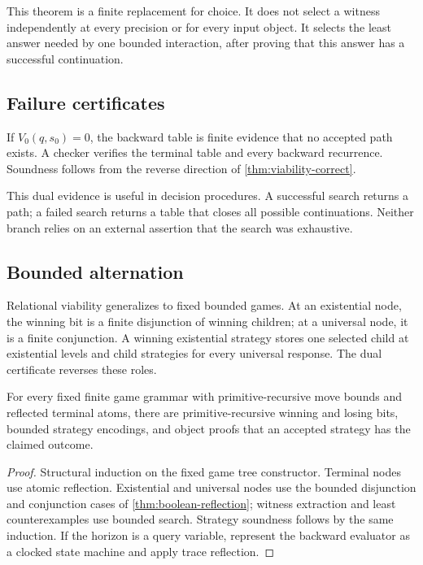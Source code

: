 This theorem is a finite replacement for choice.  It does not select a witness independently at every precision or for every input object.  It selects the least answer needed by one bounded interaction, after proving that this answer has a successful continuation.

\subsection{Failure certificates}

If \(V_0(q,s_0)=0\), the backward table is finite evidence that no accepted path exists.  A checker verifies the terminal table and every backward recurrence.  Soundness follows from the reverse direction of \cref{thm:viability-correct}.

This dual evidence is useful in decision procedures.  A successful search returns a path; a failed search returns a table that closes all possible continuations.  Neither branch relies on an external assertion that the search was exhaustive.

\subsection{Bounded alternation}

Relational viability generalizes to fixed bounded games.  At an existential node, the winning bit is a finite disjunction of winning children; at a universal node, it is a finite conjunction.  A winning existential strategy stores one selected child at existential levels and child strategies for every universal response.  The dual certificate reverses these roles.

\begin{proposition}
For every fixed finite game grammar with primitive-recursive move bounds and reflected terminal atoms, there are primitive-recursive winning and losing bits, bounded strategy encodings, and object proofs that an accepted strategy has the claimed outcome.
\end{proposition}

\begin{proof}
Structural induction on the fixed game tree constructor.  Terminal nodes use atomic reflection.  Existential and universal nodes use the bounded disjunction and conjunction cases of \cref{thm:boolean-reflection}; witness extraction and least counterexamples use bounded search.  Strategy soundness follows by the same induction.  If the horizon is a query variable, represent the backward evaluator as a clocked state machine and apply trace reflection.
\end{proof}

